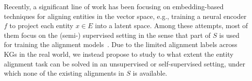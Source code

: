 
 Recently, a significant line of work has been focusing on embedding-based techniques for aligning entities in the vector space, e.g., training a neural encoder $f$ to project each entity $x \in E$ into a latent space. 
Among these attempts, most of them focus on the (semi-) supervised setting in the sense that part of $S$ is used for training the alignment models~\cite{MTransE,GCN-Align,CEAFF,tang2019bert-int,wu2019relation}. 
Due to the limited alignment labels across KGs in the real world, we instead propose to study to what extent the entity alignment task can be solved in an unsupervised or self-supervised setting, under which none of the existing alignments in $S$ is available. 

 









